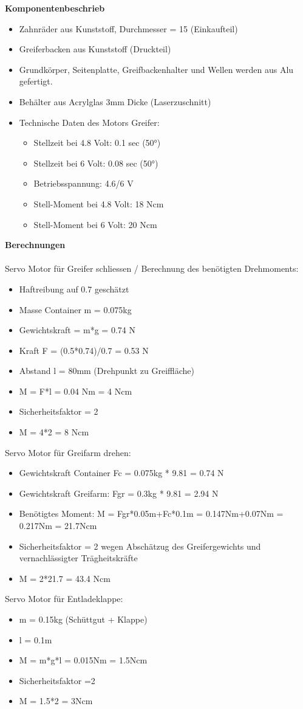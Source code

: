 \textbf{Komponentenbeschrieb}\\[0.2cm]
\begin{itemize}
\item Zahnräder aus Kunststoff, Durchmesser = 15 (Einkaufteil)
\item Greiferbacken aus Kunststoff (Druckteil)
\item Grundkörper, Seitenplatte, Greifbackenhalter und Wellen werden aus Alu gefertigt.
\item Behälter aus Acrylglas 3mm Dicke (Laserzuschnitt)
\item Technische Daten des Motors Greifer:
\begin{itemize}
\item Stellzeit bei 4.8 Volt: 0.1 sec (50°) 
\item Stellzeit bei 6 Volt: 0.08 sec (50°) 
\item Betriebsspannung: 4.6/6 V
\item Stell-Moment bei 4.8 Volt: 18 Ncm
\item Stell-Moment bei 6 Volt: 20 Ncm 
\end{itemize}
\end{itemize}
\textbf{Berechnungen}\\[0.2cm]
\\[0.2cm]
Servo Motor für Greifer schliessen /
Berechnung des benötigten Drehmoments: 
\begin{itemize}
\item Haftreibung auf 0.7 geschätzt
\item Masse Container m = 0.075kg
\item Gewichtskraft = m*g = 0.74 N
\item Kraft F = (0.5*0.74)/0.7 = 0.53 N
\item Abstand l = 80mm (Drehpunkt zu Greiffläche)
\item M = F*l = 0.04 Nm = 4 Ncm
\item Sicherheitsfaktor = 2
\item M = 4*2 = 8 Ncm
\end{itemize}
Servo Motor für Greifarm drehen:
\begin{itemize}
\item Gewichtskraft Container Fc = 0.075kg * 9.81 = 0.74 N
\item Gewichtskraft Greifarm: Fgr = 0.3kg * 9.81 = 2.94 N
\item Benötigtes Moment:
M = Fgr*0.05m+Fc*0.1m = 0.147Nm+0.07Nm = 0.217Nm = 21.7Ncm
\item Sicherheitsfaktor = 2 wegen Abschätzug des Greifergewichts und vernachlässigter Trägheitskräfte
\item M = 2*21.7 = 43.4 Ncm
\end{itemize}
Servo Motor für Entladeklappe:
\begin{itemize}
\item m = 0.15kg (Schüttgut + Klappe)
\item l = 0.1m
\item M = m*g*l = 0.015Nm = 1.5Ncm
\item Sicherheitsfaktor =2
\item M = 1.5*2 = 3Ncm
\end{itemize}
